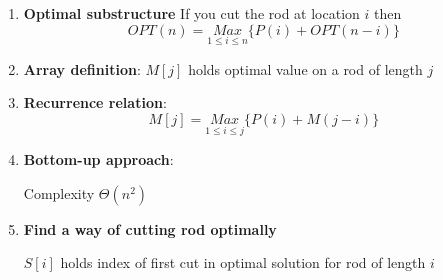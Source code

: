 \documentclass[11pt]{article}
\begin{document}
\begin{enumerate}
  \item \textbf{Optimal substructure} If you cut the rod at location $i$ then
  \[
    OPT(n) = \underset{1 \leq i \leq n}{Max} \{ P(i) + OPT(n-i)\}
  \]
  \item \textbf{Array definition}: $M[j]$ holds optimal value on a rod of length $j$
  \item \textbf{Recurrence relation}:
  \[
    M[j] = \underset{1 \leq i \leq j}{Max} \{ P(i) + M(j-i)\}
  \]
  \item \textbf{Bottom-up approach}:

  \begin{algorithm}[H]
  \end{algorithm}

  Complexity $\Theta(n^2)$

  \item \textbf{Find a way of cutting rod optimally}

  \begin{algorithm}[H]

  \end{algorithm}

  $S[i]$ holds index of first cut in optimal solution for rod of length $i$




\end{enumerate}
\end{document}
